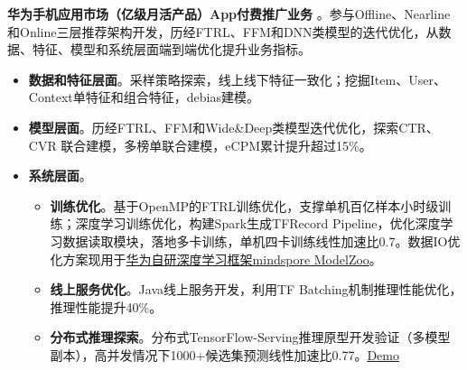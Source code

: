 \documentclass{resume}
\begin{document}

\begin{onehalfspacing}
\textbf{华为手机应用市场（亿级月活产品）App付费推广业务} 。参与Offline、Nearline和Online三层推荐架构开发，历经FTRL、FFM和DNN类模型的迭代优化，从数据、特征、模型和系统层面端到端优化提升业务指标。  
\begin{itemize}%
  \item \textbf{数据和特征层面}。采样策略探索，线上线下特征一致化；挖掘Item、User、Context单特征和组合特征，debias建模。
  \item \textbf{模型层面}。历经FTRL、FFM和Wide\&Deep类模型迭代优化，探索CTR、CVR 联合建模，多榜单联合建模，eCPM累计提升超过15\%。
  \item \textbf{系统层面}。
    \begin{itemize}
    \item \textbf{训练优化}。基于OpenMP的FTRL训练优化，支撑单机百亿样本小时级训练；深度学习训练优化，构建Spark生成TFRecord Pipeline，优化深度学习数据读取模块，落地多卡训练，单机四卡训练线性加速比0.7。数据IO优化方案现用于\href{https://github.com/mindspore-ai/mindspore/blob/master/model_zoo/official/recommend/wide_and_deep/src/datasets.py}{华为自研深度学习框架mindspore ModelZoo}。
    \item \textbf{线上服务优化}。Java线上服务开发，利用TF Batching机制推理性能优化，推理性能提升40\%。
    \item \textbf{分布式推理探索}。分布式TensorFlow-Serving推理原型开发验证（多模型副本），高并发情况下1000+候选集预测线性加速比0.77。\href{https://github.com/neuzxy/Distributed-TF-Serving.git}{Demo}
  \end{itemize}

\end{itemize}
\end{onehalfspacing}
\end{document}
